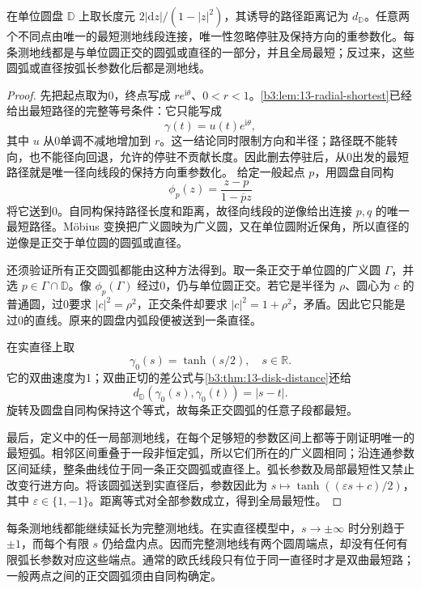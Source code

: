 \begin{theorem}[圆盘测地线]\label{b3:thm:13-disk-geodesics}
在单位圆盘 \(\mathbb D\) 上取长度元 \(2|\mathrm dz|/(1-|z|^2)\)，其诱导的路径距离记为 \(d_{\mathbb D}\)。任意两个不同点由唯一的最短测地线段连接，唯一性忽略停驻及保持方向的重参数化。每条测地线都是与单位圆正交的圆弧或直径的一部分，并且全局最短；反过来，这些圆弧或直径按弧长参数化后都是测地线。
\end{theorem}
\begin{proof}
先把起点取为0，终点写成 \(r e^{\mathrm i\theta}\)、\(0<r<1\)。\cref{b3:lem:13-radial-shortest}已经给出最短路径的完整等号条件：它只能写成
\[
 \gamma(t)=u(t)e^{\mathrm i\theta},
\]
其中 \(u\) 从0单调不减地增加到 \(r\)。这一结论同时限制方向和半径；路径既不能转向，也不能径向回退，允许的停驻不贡献长度。因此删去停驻后，从0出发的最短路径就是唯一径向线段的保持方向重参数化。
给定一般起点 \(p\)，用圆盘自同构
\[
 \phi_p(z)=\frac{z-p}{1-\overline pz}
\]
将它送到0。自同构保持路径长度和距离，故径向线段的逆像给出连接 \(p,q\) 的唯一最短路径。Möbius 变换把广义圆映为广义圆，又在单位圆附近保角，所以直径的逆像是正交于单位圆的圆弧或直径。

还须验证所有正交圆弧都能由这种方法得到。取一条正交于单位圆的广义圆 \(\Gamma\)，并选 \(p\in\Gamma\cap\mathbb D\)。像 \(\phi_p(\Gamma)\) 经过0，仍与单位圆正交。若它是半径为 \(\rho\)、圆心为 \(c\) 的普通圆，过0要求 \(|c|^2=\rho^2\)，正交条件却要求 \(|c|^2=1+\rho^2\)，矛盾。因此它只能是过0的直线。原来的圆盘内弧段便被送到一条直径。

在实直径上取
\[
 \gamma_0(s)=\tanh(s/2),\quad s\in\mathbb R.
\]
它的双曲速度为1；双曲正切的差公式与\cref{b3:thm:13-disk-distance}还给
\[
 d_{\mathbb D}(\gamma_0(s),\gamma_0(t))=|s-t|.
\]
旋转及圆盘自同构保持这个等式，故每条正交圆弧的任意子段都最短。

最后，定义中的任一局部测地线，在每个足够短的参数区间上都等于刚证明唯一的最短弧。相邻区间重叠于一段非恒定弧，所以它们所在的广义圆相同；沿连通参数区间延续，整条曲线位于同一条正交圆弧或直径上。弧长参数及局部最短性又禁止改变行进方向。将该圆弧送到实直径后，参数因此为 \(s\mapsto\tanh((\varepsilon s+c)/2)\)，其中 \(\varepsilon\in\{1,-1\}\)。距离等式对全部参数成立，得到全局最短性。
\end{proof}

每条测地线都能继续延长为完整测地线。在实直径模型中，\(s\to\pm\infty\) 时分别趋于 \(\pm1\)，而每个有限 \(s\) 仍给盘内点。因而完整测地线有两个圆周端点，却没有任何有限弧长参数对应这些端点。通常的欧氏线段只有位于同一直径时才是双曲最短路；一般两点之间的正交圆弧须由自同构确定。

